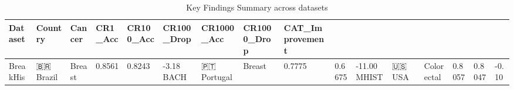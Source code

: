\begin{table}
\caption{Key Findings Summary across datasets}
\label{tab:summary}
\begin{tabular}{lllllllll}
\toprule
Dataset & Country & Cancer & CR1_Acc & CR100_Acc & CR100_Drop & CR1000_Acc & CR1000_Drop & CAT_Improvement \\
\midrule
BreakHis & 🇧🇷 Brazil & Breast & 0.8561 & 0.8243 & -3.18%
BACH & 🇵🇹 Portugal & Breast & 0.7775 & 0.6675 & -11.00%
MHIST & 🇺🇸 USA & Colorectal & 0.8057 & 0.8047 & -0.10%
\bottomrule
\end{tabular}
\end{table}
